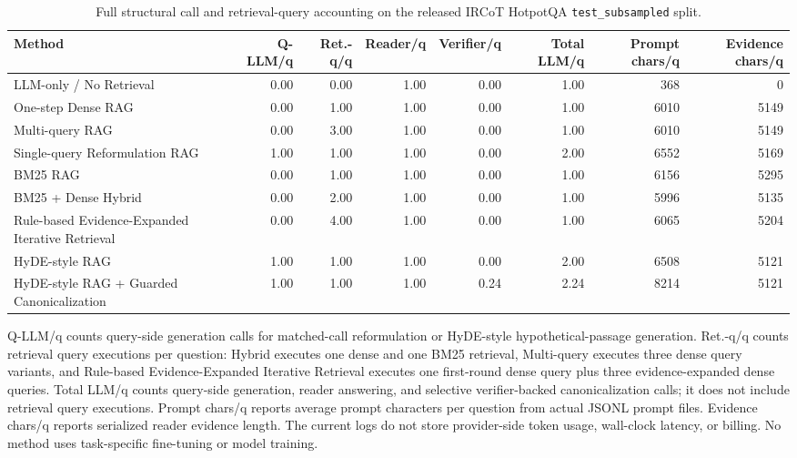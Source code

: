 \begin{table}
\centering
\caption{Full structural call and retrieval-query accounting on the released IRCoT HotpotQA \texttt{test\_subsampled} split.}
\label{tab:efficiency_profile_full}
\footnotesize
\setlength{\tabcolsep}{3pt}
\begin{tabularx}{\textheight}{>{\raggedright\arraybackslash}X r r r r r r r}
\toprule
Method & Q-LLM/q & Ret.-q/q & Reader/q & Verifier/q & Total LLM/q & Prompt chars/q & Evidence chars/q \\
\midrule
LLM-only / No Retrieval & 0.00 & 0.00 & 1.00 & 0.00 & 1.00 & 368 & 0 \\
One-step Dense RAG & 0.00 & 1.00 & 1.00 & 0.00 & 1.00 & 6010 & 5149 \\
Multi-query RAG & 0.00 & 3.00 & 1.00 & 0.00 & 1.00 & 6010 & 5149 \\
Single-query Reformulation RAG & 1.00 & 1.00 & 1.00 & 0.00 & 2.00 & 6552 & 5169 \\
BM25 RAG & 0.00 & 1.00 & 1.00 & 0.00 & 1.00 & 6156 & 5295 \\
BM25 + Dense Hybrid & 0.00 & 2.00 & 1.00 & 0.00 & 1.00 & 5996 & 5135 \\
Rule-based Evidence-Expanded Iterative Retrieval & 0.00 & 4.00 & 1.00 & 0.00 & 1.00 & 6065 & 5204 \\
HyDE-style RAG & 1.00 & 1.00 & 1.00 & 0.00 & 2.00 & 6508 & 5121 \\
HyDE-style RAG + Guarded Canonicalization & 1.00 & 1.00 & 1.00 & 0.24 & 2.24 & 8214 & 5121 \\
\bottomrule
\end{tabularx}
\begin{tablenotes}
\footnotesize
\item Q-LLM/q counts query-side generation calls for matched-call reformulation or HyDE-style hypothetical-passage generation. Ret.-q/q counts retrieval query executions per question: Hybrid executes one dense and one BM25 retrieval, Multi-query executes three dense query variants, and Rule-based Evidence-Expanded Iterative Retrieval executes one first-round dense query plus three evidence-expanded dense queries. Total LLM/q counts query-side generation, reader answering, and selective verifier-backed canonicalization calls; it does not include retrieval query executions. Prompt chars/q reports average prompt characters per question from actual JSONL prompt files. Evidence chars/q reports serialized reader evidence length. The current logs do not store provider-side token usage, wall-clock latency, or billing. No method uses task-specific fine-tuning or model training.
\end{tablenotes}
\end{table}
